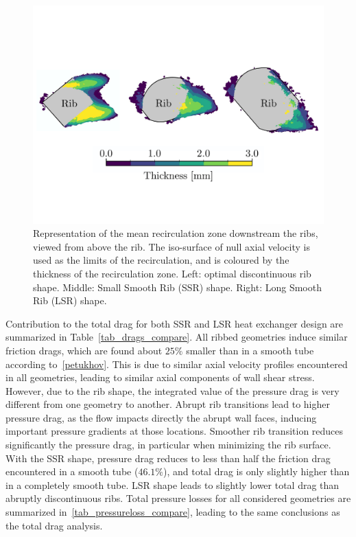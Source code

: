 \begin{figure}[h]
\centering
\includegraphics[width=\linewidth,keepaspectratio]{fig/applications/optim/Recircul_zones2.pdf}
\caption{Representation of the mean recirculation zone downstream the ribs, viewed from above the rib. The iso-surface of null axial velocity is used as the limits of the recirculation, and is coloured by the thickness of the recirculation zone. Left: optimal discontinuous rib shape. Middle: Small Smooth Rib (SSR) shape. Right: Long Smooth Rib (LSR) shape.}
\label{recircul_zones}
\end{figure}

Contribution to the total drag for both SSR and LSR heat exchanger design are summarized in Table~\ref{tab_drags_compare}. All ribbed geometries induce similar friction drags, which are found about $25 \%$ smaller than in a smooth tube according to~\cref{petukhov}. This is due to similar axial velocity profiles encountered in all geometries, leading to similar axial components of wall shear stress. However, due to the rib shape, the integrated value of the pressure drag is very different from one geometry to another. Abrupt rib transitions lead to higher pressure drag, as the flow impacts directly the abrupt wall faces, inducing important pressure gradients at those locations. Smoother rib transition reduces significantly the pressure drag, in particular when minimizing the rib surface. With the SSR shape, pressure drag reduces to less than half the friction drag encountered in a smooth tube ($46.1 \%$), and total drag is only slightly higher than in a completely smooth tube. LSR shape leads to slightly lower total drag than abruptly discontinuous ribs. Total pressure losses for all considered geometries are summarized in~\cref{tab_pressureloss_compare}, leading to the same conclusions as the total drag analysis.

